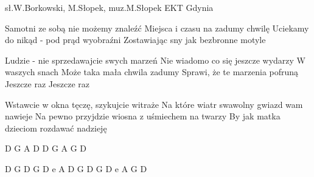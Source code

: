 {sł.W.Borkowski, M.Słopek, muz.M.Słopek}
{EKT Gdynia}
\begin{text}
Samotni ze sobą nie możemy znaleźć
Miejsca i czasu na zadumy chwilę
Uciekamy do nikąd - pod prąd wyobraźni 
Zostawiając sny jak bezbronne motyle

Ludzie - nie sprzedawajcie swych marzeń 
Nie wiadomo co się jeszcze wydarzy
W waszych snach
Może taka mała chwila zadumy
Sprawi, że te marzenia pofruną
Jeszcze raz
Jeszcze raz

Wstawcie w okna tęczę, szykujcie witraże
Na które wiatr swawolny gwiazd wam nawieje
Na pewno przyjdzie wiosna z uśmiechem na twarzy
By jak matka dzieciom rozdawać nadzieję
\end{text}
\begin{chord}
D G
A D
D G
A G D

D G D
G D
e A
D G D
G D
e A
G D
\end{chord}